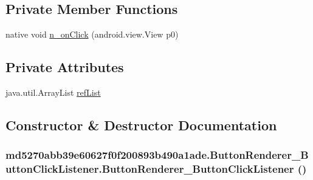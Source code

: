 \subsection*{Private Member Functions}
\begin{CompactItemize}
\item 
native void \hyperlink{classmd5270abb39e60627f0f200893b490a1ade_1_1_button_renderer___button_click_listener_d1408c7cbac5ba30955a4bb1c16d772b}{n\_\-onClick} (android.view.View p0)
\end{CompactItemize}
\subsection*{Private Attributes}
\begin{CompactItemize}
\item 
java.util.ArrayList \hyperlink{classmd5270abb39e60627f0f200893b490a1ade_1_1_button_renderer___button_click_listener_2781bda06e4b65dcdacc8edd70517d98}{refList}
\end{CompactItemize}


\subsection{Constructor \& Destructor Documentation}
\hypertarget{classmd5270abb39e60627f0f200893b490a1ade_1_1_button_renderer___button_click_listener_067655cc5bd5198fa2b09218eb107c8a}{
\subsubsection[{ButtonRenderer\_\-ButtonClickListener}]{\setlength{\rightskip}{0pt plus 5cm}md5270abb39e60627f0f200893b490a1ade.ButtonRenderer\_\-ButtonClickListener.ButtonRenderer\_\-ButtonClickListener ()}}
\label{classmd5270abb39e60627f0f200893b490a1ade_1_1_button_renderer___button_click_listener_067655cc5bd5198fa2b09218eb107c8a}




